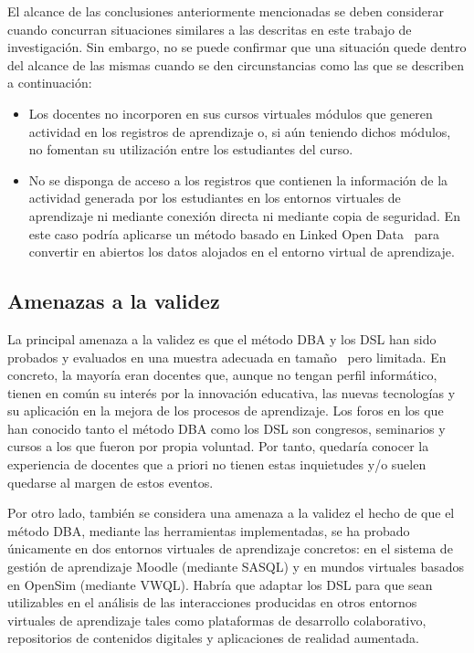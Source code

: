 El alcance de las conclusiones anteriormente mencionadas se deben considerar cuando concurran situaciones similares a las descritas en este trabajo de investigación. Sin embargo, no se puede confirmar que una situación quede dentro del alcance de las mismas cuando se den circunstancias como las que se describen a continuación:

\begin{itemize}
\item Los docentes no incorporen en sus cursos virtuales módulos que generen actividad en los registros de aprendizaje o, si aún teniendo dichos módulos, no fomentan su utilización entre los estudiantes del curso.
\item No se disponga de acceso a los registros que contienen la información de la actividad generada por los estudiantes en los entornos virtuales de aprendizaje ni mediante conexión directa ni mediante copia de seguridad. En este caso podría aplicarse un método basado en Linked Open Data~\cite{ruiz2015framework} para convertir en abiertos los datos alojados en el entorno virtual de aprendizaje. 
\end{itemize}

\subsection{Amenazas a la validez}

La principal amenaza a la validez es que el método DBA y los DSL han sido probados y evaluados en una muestra adecuada en tamaño~\cite{oates2006researching} pero limitada. En concreto, la mayoría eran docentes que, aunque no tengan perfil informático, tienen en común su interés por la innovación educativa, las nuevas tecnologías y su aplicación en la mejora de los procesos de aprendizaje. Los foros en los que han conocido tanto el método DBA como los DSL son congresos, seminarios y cursos a los que fueron por propia voluntad. Por tanto, quedaría conocer la experiencia de docentes que a priori no tienen estas inquietudes y/o suelen quedarse al margen de estos eventos.

Por otro lado, también se considera una amenaza a la validez el hecho de que el método DBA, mediante las herramientas implementadas, se ha probado únicamente en dos entornos virtuales de aprendizaje concretos: en el sistema de gestión de aprendizaje Moodle (mediante SASQL) y en mundos virtuales basados en OpenSim (mediante VWQL). Habría que adaptar los DSL para que sean utilizables en el análisis de las interacciones producidas en otros entornos virtuales de aprendizaje tales como plataformas de desarrollo colaborativo, repositorios de contenidos digitales y aplicaciones de realidad aumentada.

